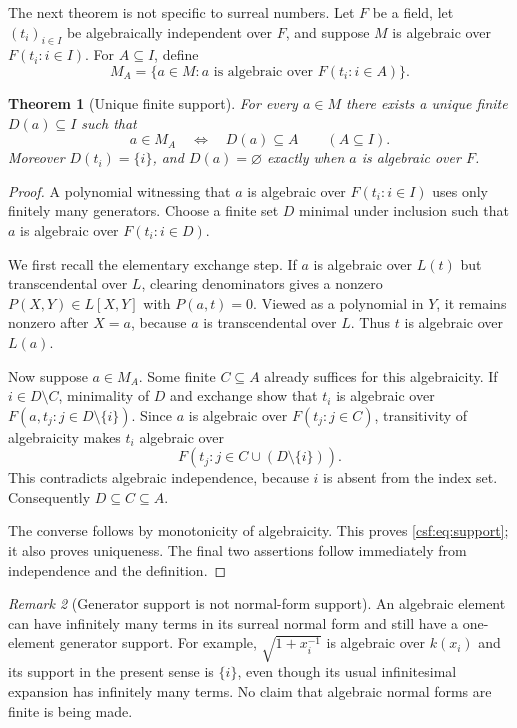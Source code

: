 \documentclass[11pt,a4paper]{article}
\numberwithin{equation}{section}
\newtheorem{theorem}{Theorem}[section]
\theoremstyle{definition}
\theoremstyle{remark}
\newtheorem{remark}[theorem]{Remark}
\begin{document}
The next theorem is not specific to surreal numbers. Let $F$ be a field,
let $(t_i)_{i\in I}$ be algebraically independent over $F$, and suppose
$M$ is algebraic over $F(t_i:i\in I)$. For $A\subseteq I$, define
\[
 M_A=\{a\in M:a\text{ is algebraic over }F(t_i:i\in A)\}.
\]

\begin{theorem}[Unique finite support]
\label{csf:thm:support}
For every $a\in M$ there exists a unique finite $D(a)\subseteq I$ such that
\begin{equation}
 a\in M_A\quad\Longleftrightarrow\quad D(a)\subseteq A
 \qquad(A\subseteq I).
 \label{csf:eq:support}
\end{equation}
Moreover $D(t_i)=\{i\}$, and $D(a)=\varnothing$ exactly when $a$ is algebraic
over $F$.
\end{theorem}
\begin{proof}
A polynomial witnessing that $a$ is algebraic over $F(t_i:i\in I)$ uses
only finitely many generators. Choose a finite set $D$ minimal under
inclusion such that $a$ is algebraic over $F(t_i:i\in D)$.

We first recall the elementary exchange step. If $a$ is algebraic over
$L(t)$ but transcendental over $L$, clearing denominators gives a nonzero
$P(X,Y)\in L[X,Y]$ with $P(a,t)=0$. Viewed as a polynomial in $Y$, it
remains nonzero after $X=a$, because $a$ is transcendental over $L$.
Thus $t$ is algebraic over $L(a)$.

Now suppose $a\in M_A$. Some finite $C\subseteq A$ already suffices for
this algebraicity. If $i\in D\setminus C$, minimality of $D$ and exchange
show that $t_i$ is algebraic over
$F(a,t_j:j\in D\setminus\{i\})$. Since $a$ is algebraic over $F(t_j:j\in C)$,
transitivity of algebraicity makes $t_i$ algebraic over
\[
 F(t_j:j\in C\cup(D\setminus\{i\})).
\]
This contradicts algebraic independence, because $i$ is absent from the
index set. Consequently $D\subseteq C\subseteq A$.

The converse follows by monotonicity of algebraicity. This proves
\eqref{csf:eq:support}; it also proves uniqueness. The final two assertions
follow immediately from independence and the definition.
\end{proof}

\begin{remark}[Generator support is not normal-form support]
An algebraic element can have infinitely many terms in its surreal normal
form and still have a one-element generator support. For example,
$\sqrt{1+x_i^{-1}}$ is algebraic over $k(x_i)$ and its support in the present
sense is $\{i\}$, even though its usual infinitesimal expansion has
infinitely many terms. No claim that algebraic normal forms are finite is
being made.
\end{remark}
\end{document}
